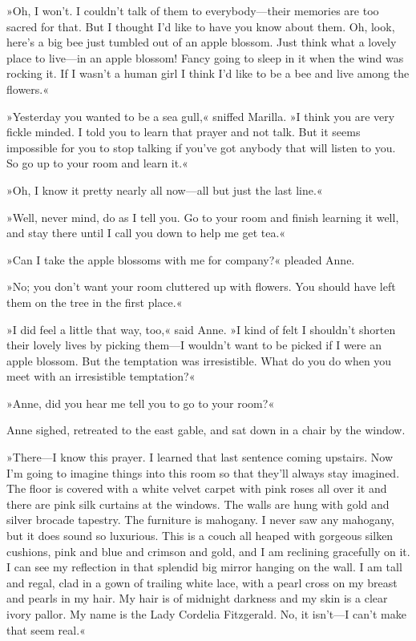 »Oh, I won't. I couldn't talk of them to everybody—their memories are too sacred for that. But I thought I'd like to have you know about them. Oh, look, here's a big bee just tumbled out of an apple blossom. Just think what a lovely place to live—in an apple blossom! Fancy going to sleep in it when the wind was rocking it. If I wasn't a human girl I think I'd like to be a bee and live among the flowers.«

»Yesterday you wanted to be a sea gull,« sniffed Marilla. »I think you are very fickle minded. I told you to learn that prayer and not talk. But it seems impossible for you to stop talking if you've got anybody that will listen to you. So go up to your room and learn it.«

»Oh, I know it pretty nearly all now—all but just the last line.«

»Well, never mind, do as I tell you. Go to your room and finish learning it well, and stay there until I call you down to help me get tea.«

»Can I take the apple blossoms with me for company?« pleaded Anne.

»No; you don't want your room cluttered up with flowers. You should have left them on the tree in the first place.«

»I did feel a little that way, too,« said Anne. »I kind of felt I shouldn't shorten their lovely lives by picking them—I wouldn't want to be picked if I were an apple blossom. But the temptation was irresistible. What do you do when you meet with an irresistible temptation?«

»Anne, did you hear me tell you to go to your room?«

Anne sighed, retreated to the east gable, and sat down in a chair by the window.

»There—I know this prayer. I learned that last sentence coming upstairs. Now I'm going to imagine things into this room so that they'll always stay imagined. The floor is covered with a white velvet carpet with pink roses all over it and there are pink silk curtains at the windows. The walls are hung with gold and silver brocade tapestry. The furniture is mahogany. I never saw any mahogany, but it does sound so luxurious. This is a couch all heaped with gorgeous silken cushions, pink and blue and crimson and gold, and I am reclining gracefully on it. I can see my reflection in that splendid big mirror hanging on the wall. I am tall and regal, clad in a gown of trailing white lace, with a pearl cross on my breast and pearls in my hair. My hair is of midnight darkness and my skin is a clear ivory pallor. My name is the Lady Cordelia Fitzgerald. No, it isn't—I can't make that seem real.«

